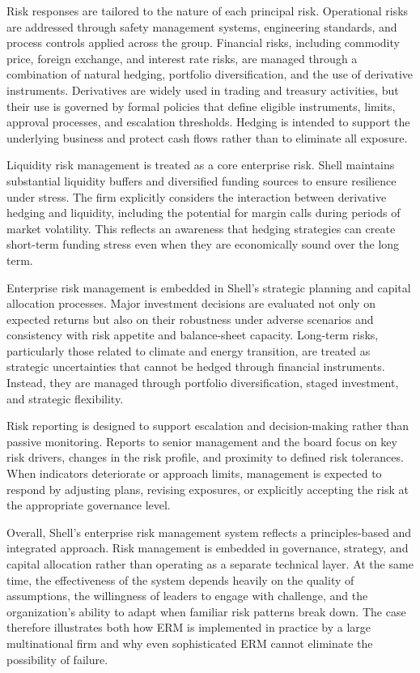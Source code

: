 \documentclass[11pt]{article}
\begin{document}
Risk responses are tailored to the nature of each principal risk. Operational
risks are addressed through safety management systems, engineering standards,
and process controls applied across the group. Financial risks, including
commodity price, foreign exchange, and interest rate risks, are managed through
a combination of natural hedging, portfolio diversification, and the use of
derivative instruments. Derivatives are widely used in trading and treasury
activities, but their use is governed by formal policies that define eligible
instruments, limits, approval processes, and escalation thresholds. Hedging is
intended to support the underlying business and protect cash flows rather than
to eliminate all exposure.

Liquidity risk management is treated as a core enterprise risk. Shell maintains
substantial liquidity buffers and diversified funding sources to ensure
resilience under stress. The firm explicitly considers the interaction between
derivative hedging and liquidity, including the potential for margin calls
during periods of market volatility. This reflects an awareness that hedging
strategies can create short-term funding stress even when they are economically
sound over the long term.

Enterprise risk management is embedded in Shell’s strategic planning and
capital allocation processes. Major investment decisions are evaluated not only
on expected returns but also on their robustness under adverse scenarios and
consistency with risk appetite and balance-sheet capacity. Long-term risks,
particularly those related to climate and energy transition, are treated as
strategic uncertainties that cannot be hedged through financial instruments.
Instead, they are managed through portfolio diversification, staged investment,
and strategic flexibility.

Risk reporting is designed to support escalation and decision-making rather
than passive monitoring. Reports to senior management and the board focus on
key risk drivers, changes in the risk profile, and proximity to defined risk
tolerances. When indicators deteriorate or approach limits, management is
expected to respond by adjusting plans, revising exposures, or explicitly
accepting the risk at the appropriate governance level.

Overall, Shell’s enterprise risk management system reflects a principles-based
and integrated approach. Risk management is embedded in governance, strategy,
and capital allocation rather than operating as a separate technical layer.
At the same time, the effectiveness of the system depends heavily on the
quality of assumptions, the willingness of leaders to engage with challenge,
and the organization’s ability to adapt when familiar risk patterns break
down. The case therefore illustrates both how ERM is implemented in practice
by a large multinational firm and why even sophisticated ERM cannot eliminate
the possibility of failure.
\end{document}
